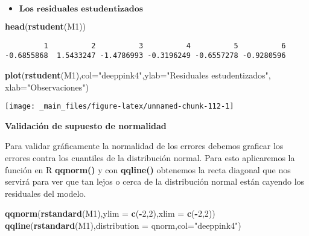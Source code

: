 \documentclass[
  a4paper,
  oneside,
  openany]{book}
\newenvironment{Shaded}{\begin{snugshade}}{\end{snugshade}}
\newcommand{\AttributeTok}[1]{\textcolor[rgb]{0.13,0.29,0.53}{#1}}
\newcommand{\DecValTok}[1]{\textcolor[rgb]{0.00,0.00,0.81}{#1}}
\newcommand{\FunctionTok}[1]{\textcolor[rgb]{0.13,0.29,0.53}{\textbf{#1}}}
\newcommand{\NormalTok}[1]{#1}
\newcommand{\SpecialCharTok}[1]{\textcolor[rgb]{0.81,0.36,0.00}{\textbf{#1}}}
\newcommand{\StringTok}[1]{\textcolor[rgb]{0.31,0.60,0.02}{#1}}
\providecommand{\tightlist}{%
  \setlength{\itemsep}{0pt}\setlength{\parskip}{0pt}}
\begin{document}
\begin{itemize}
\tightlist
\item
  \(\textbf{Los residuales estudentizados}\)
\end{itemize}

\begin{Shaded}
\begin{Highlighting}[]
\FunctionTok{head}\NormalTok{(}\FunctionTok{rstudent}\NormalTok{(M1))}
\end{Highlighting}
\end{Shaded}

\begin{verbatim}
         1          2          3          4          5          6 
-0.6855868  1.5433247 -1.4786993 -0.3196249 -0.6557278 -0.9280596 
\end{verbatim}

\begin{Shaded}
\begin{Highlighting}[]
\FunctionTok{plot}\NormalTok{(}\FunctionTok{rstudent}\NormalTok{(M1),}\AttributeTok{col=}\StringTok{"deeppink4"}\NormalTok{,}\AttributeTok{ylab=}\StringTok{"Residuales estudentizados"}\NormalTok{, }\AttributeTok{xlab=}\StringTok{"Observaciones"}\NormalTok{)}
\end{Highlighting}
\end{Shaded}

\begin{center}\texttt{[image: \_main\_files/figure-latex/unnamed-chunk-112-1]} \end{center}

\textbf{Validación de supuesto de normalidad}

Para validar gráficamente la normalidad de los errores debemos graficar los errores contra los cuantiles de la distribución normal. Para esto aplicaremos la función en R \textbf{qqnorm()} y con \textbf{qqline()} obtenemos la recta diagonal que nos servirá para ver que tan lejos o cerca de la distribución normal están cayendo los residuales del modelo.

\begin{Shaded}
\begin{Highlighting}[]
\FunctionTok{qqnorm}\NormalTok{(}\FunctionTok{rstandard}\NormalTok{(M1),}\AttributeTok{ylim =} \FunctionTok{c}\NormalTok{(}\SpecialCharTok{{-}}\DecValTok{2}\NormalTok{,}\DecValTok{2}\NormalTok{),}\AttributeTok{xlim =} \FunctionTok{c}\NormalTok{(}\SpecialCharTok{{-}}\DecValTok{2}\NormalTok{,}\DecValTok{2}\NormalTok{))}
\FunctionTok{qqline}\NormalTok{(}\FunctionTok{rstandard}\NormalTok{(M1),}\AttributeTok{distribution =}\NormalTok{ qnorm,}\AttributeTok{col=}\StringTok{"deeppink4"}\NormalTok{)}
\end{Highlighting}
\end{Shaded}
\end{document}
